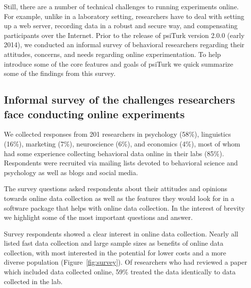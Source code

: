 \documentclass[twocolumn]{svjour3}          %
\newcommand{\psiturk}[0]{\textsf{psiTurk}}
\begin{document}
Still, there are a number of technical challenges to running experiments online.
For example, unlike in a laboratory setting, researchers have to 
deal with setting up a web server, recording data in a robust and secure way, 
and compensating participants over the Internet.  
Prior to the release of \psiturk{} version
2.0.0 (early 2014), we conducted an informal survey of behavioral researchers 
regarding their attitudes, concerns, and needs regarding online experimentation. 
To help introduce some of the core features and goals of \psiturk{} we 
quick summarize some of the findings from this survey.



\subsection{Informal survey of the challenges researchers face conducting online experiments}
 We collected responses from 201 researchers in psychology (58\%),
linguistics (16\%), marketing (7\%), neuroscience (6\%), and economics (4\%), most of 
whom had some experience collecting behavioral data online in their labs (85\%).  
Respondents were recruited via mailing lists devoted to behavioral science and psychology 
as well as blogs and social media. 

The survey questions asked respondents about their attitudes and opinions towards
online data collection as well as the features they would look for in a software package
that helps with online data collection.  In the interest of brevity we highlight some of the
most important questions and answer.

Survey respondents showed a clear interest in online data collection. Nearly all listed fast data
collection and large sample sizes as benefits of online data collection, with most
interested in the potential for lower costs and a more diverse population
(Figure~\ref{fig:survey}). Of researchers who had reviewed a paper which included data 
collected online, 59\% treated the data identically to data collected in the lab.


\end{document}
